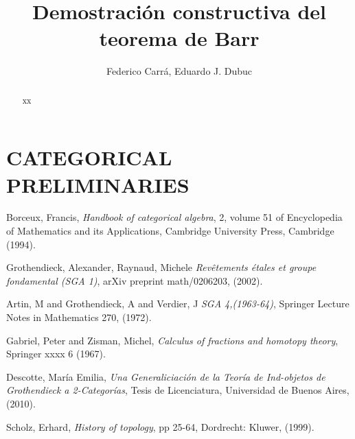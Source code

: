 \documentclass[12pt]{article}
\numberwithin{equation}{section}
\theoremstyle{plain}
\theoremstyle{definition}
\begin{document}
 



\title{Demostraci\'on constructiva del teorema de Barr}

\author{Federico Carr\'a, Eduardo J. Dubuc}

\date{\vspace{-5ex}}

\maketitle

\begin{abstract}
xx%
\end{abstract}






\tableofcontents



\section{CATEGORICAL PRELIMINARIES}\label{preliminares}

















\begin{thebibliography}{99}

Borceux, Francis, \emph{Handbook of categorical algebra}, 2, volume 51 of Encyclopedia of Mathematics and its Applications, Cambridge University Press, Cambridge (1994).

Grothendieck, Alexander, Raynaud, Michele
\emph{Rev\^etements \'etales et groupe fondamental (SGA 1)}, 
arXiv preprint math/0206203, (2002).

Artin, M and Grothendieck, A and Verdier, J
\emph{SGA 4,(1963-64)}, 
Springer Lecture Notes in Mathematics 270, (1972).

 Gabriel, Peter and Zisman, Michel, 
\emph{Calculus of fractions and homotopy theory},
Springer xxxx  6  (1967).

 Descotte, Mar\'ia Emilia, 
\emph{Una Generaliciaci\'on de la Teor\'ia de Ind-objetos de Grothendieck a 2-Categor\'ias}, Tesis de Licenciatura,
Universidad de Buenos Aires, (2010).  

 Scholz, Erhard, 
\emph{History of topology}, pp 25-64, 
Dordrecht: Kluwer, (1999).

\end{thebibliography}
\end{document}
